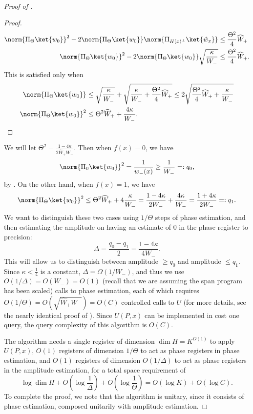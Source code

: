 \documentclass{toc}
\begin{document}
\begin{proof}[Proof of ]
\begin{proof}
\begin{align*}
\norm{\Pi_{\Theta}\ket{w_0}}^2 -2\norm{\Pi_\Theta\ket{w_0}}\norm{\Pi_{H(x)^\bot}\ket{\hat{w}_x}} &\leq  \frac{\Theta^2}{4}\widehat{W}_+\\
\norm{\Pi_{\Theta}\ket{w_0}}^2 -2\norm{\Pi_\Theta\ket{w_0}}\sqrt{\frac{\kappa}{W_-}} &\leq  \frac{\Theta^2}{4}\widehat{W}_+.
\end{align*}
This is satisfied only when 
\begin{align*}
\norm{\Pi_\Theta\ket{w_0}} &\leq  \sqrt{\frac{\kappa}{W_-}}+\sqrt{\frac{\kappa}{W_-}+\frac{\Theta^2}{4}\widehat{W}_+}
\leq  2\sqrt{\frac{\Theta^2}{4}\widehat{W}_+ + \frac{\kappa}{W_-}}\\
\norm{\Pi_\Theta\ket{w_0}}^2 &\leq  \Theta^2\widehat{W}_+ + \frac{4\kappa }{W_-}. \qedhere
\end{align*}
\end{proof}

We will let $\Theta^2=\frac{1-4\kappa}{2\widehat{W}_+W_-}$. Then when $f(x)=0$, we have
$$\norm{\Pi_0\ket{w_0}}^2=\frac{1}{w_-(x)}\geq \frac{1}{W_-}=:q_0,$$
by \cite[Lemma 3.3]{IJ15}. On the other hand, when $f(x)=1$, 
we have %
$$\norm{\Pi_\Theta\ket{w_0}}^2\leq \Theta^2\widehat{W}_++4\frac{\kappa}{W_-}=\frac{1-4\kappa}{2W_-}+\frac{4\kappa}{W_-}= \frac{1+4\kappa}{2W_-}  =:q_1.$$
We want to distinguish these two cases using $1/\Theta$ steps of phase estimation, and then estimating the amplitude on having an estimate of 0 in the phase register to precision:
$$\Delta=\frac{q_0-q_1}{2}=\frac{1-4\kappa}{4W_-}.$$
This will allow us to distinguish between amplitude $\geq q_0$ and amplitude $\leq q_1$.
Since $\kappa<\frac{1}{4}$ is a constant, $\Delta=\Omega(1/W_-)$, and thus we use $O(1/\Delta)=O(W_-)=O(1)$ (recall that we are assuming the span program has been scaled) calls to phase estimation, each of which requires $O(1/\Theta)=O\left(\sqrt{\widehat{W}_+W_-}\right)=O(C)$ controlled calls to $U$ (for more details, see the nearly identical proof of \cite[Lemma 3.2]{IJ15}). Since $U(P,x)$ can be implemented in cost one query, the query complexity of this algorithm is $O(C)$. 

The algorithm needs a single register of dimension $\dim H = K^{O(1)}$ to apply $U(P,x)$, $O(1)$ registers of dimension $1/\Theta$ to act as phase registers in phase estimation, and $O(1)$ registers of dimension $O(1/\Delta)$ to act as phase registers in the amplitude estimation, for a total space requirement of 
$$\log\dim H + O\left(\log\frac{1}{\Delta}\right)+O\left(\log\frac{1}{\Theta}\right)=O(\log K)+O(\log C).$$
To complete the proof, we note that the algorithm is unitary, since it consists of phase estimation, composed unitarily with amplitude estimation.
\end{proof}
\end{document}

